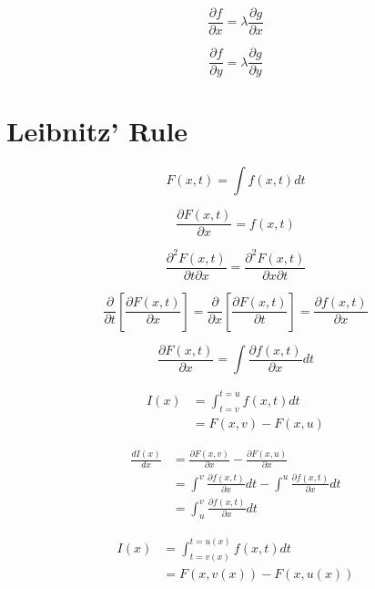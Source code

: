 \begin{equation*}
    \frac{\partial f}{\partial x} = \lambda\frac{\partial g}{\partial x}
\end{equation*}

\begin{equation*}
    \frac{\partial f}{\partial y} = \lambda\frac{\partial g}{\partial y}
\end{equation*}

\section{Leibnitz' Rule}

\begin{equation*}
    F(x,t) = \int f(x,t)dt
\end{equation*}

\begin{equation*}
    \frac{\partial F(x,t)}{\partial x} = f(x,t)
\end{equation*}

\begin{equation*}
    \frac{\partial^{2}F(x,t)}{\partial t \partial x} = \frac{\partial^{2}F(x,t)}{\partial x \partial t}
\end{equation*}

\begin{equation*}
    \frac{\partial}{\partial t}\left[\frac{\partial F(x,t)}{\partial x}\right] =
    \frac{\partial}{\partial x}\left[\frac{\partial F(x,t)}{\partial t}\right] =
    \frac{\partial f(x,t)}{\partial x}
\end{equation*}

\begin{equation*}
    \frac{\partial F(x,t)}{\partial x} = \int \frac{\partial f(x,t)}{\partial x} dt
\end{equation*}

\begin{align*}
    I(x) &= \int_{t=v}^{t=u}f(x,t)dt\\
    &= F(x,v) - F(x,u)
\end{align*}

\begin{align*}
    \frac{dI(x)}{dx} &= \frac{\partial F(x,v)}{\partial x} - \frac{\partial F(x,u)}{\partial x}\\
    &= \int^{v} \frac{\partial f(x,t)}{\partial x}dt - \int^{u} \frac{\partial f(x,t)}{\partial x}dt\\
    &= \int_{u}^{v} \frac{\partial f(x,t)}{\partial x}dt
\end{align*}

\begin{align*}
    I(x) &= \int_{t=v(x)}^{t=u(x)}f(x,t)dt\\
    &= F(x,v(x)) - F(x,u(x))
\end{align*}